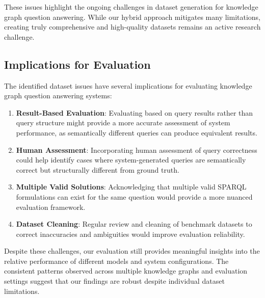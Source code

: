 These issues highlight the ongoing challenges in dataset generation for knowledge graph question answering. While our hybrid approach mitigates many limitations, creating truly comprehensive and high-quality datasets remains an active research challenge.

\subsection{Implications for Evaluation}
The identified dataset issues have several implications for evaluating knowledge graph question answering systems:

\begin{enumerate}
    \item \textbf{Result-Based Evaluation}: Evaluating based on query results rather than query structure might provide a more accurate assessment of system performance, as semantically different queries can produce equivalent results.
    
    \item \textbf{Human Assessment}: Incorporating human assessment of query correctness could help identify cases where system-generated queries are semantically correct but structurally different from ground truth.
    
    \item \textbf{Multiple Valid Solutions}: Acknowledging that multiple valid SPARQL formulations can exist for the same question would provide a more nuanced evaluation framework.
    
    \item \textbf{Dataset Cleaning}: Regular review and cleaning of benchmark datasets to correct inaccuracies and ambiguities would improve evaluation reliability.
\end{enumerate}

Despite these challenges, our evaluation still provides meaningful insights into the relative performance of different models and system configurations. The consistent patterns observed across multiple knowledge graphs and evaluation settings suggest that our findings are robust despite individual dataset limitations.